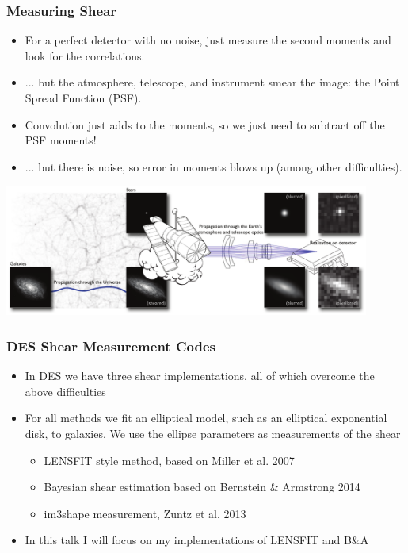 \documentclass{beamer}
\begin{document}
\frame
{
    \frametitle{Measuring Shear}

    \begin{itemize}

        \item For a perfect detector with no noise, just measure
            the second moments and look for the correlations.

        \item ... but the atmosphere, telescope, and instrument smear
            the image: the Point Spread Function (PSF).

        \item Convolution just adds to the moments, so we just need to
            subtract off the PSF moments!

        \item ... but there is noise, so error in moments blows up (among other
            difficulties).

    \end{itemize}

    \includegraphics[width=0.9\textwidth]{great3-systematics.pdf}
}

\frame
{
    \frametitle{DES Shear Measurement Codes}

    \begin{itemize}

        \item In DES we have three shear implementations, all of which
            overcome the above difficulties

        \item For all methods we fit an elliptical model, such as an elliptical
            exponential disk, to galaxies.  We use the ellipse parameters as
            measurements of the shear

        \begin{itemize}
            \item LENSFIT style method, based on Miller et al. 2007

            \item Bayesian shear estimation based on Bernstein \& Armstrong 2014

            \item im3shape measurement, Zuntz et al. 2013
        \end{itemize}

        \item In this talk I will focus on my implementations of
            LENSFIT and B\&A

    \end{itemize}
}
\end{document}
